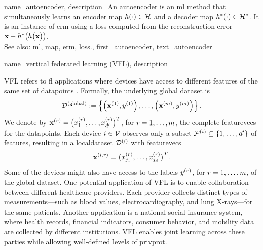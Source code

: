 {name={autoencoder},
	description={An autoencoder is an \gls{ml} method that simultaneously learns an encoder \gls{map} 
		$h(\cdot) \in \mathcal{H}$ and a decoder \gls{map} $h^{*}(\cdot) \in \mathcal{H}^{*}$. 
		It is an instance of \gls{erm} using a \gls{loss} computed from the reconstruction error 
		${\bf x} - h^{*}\big(  h \big( {\bf x} \big) \big)$.
					\\ 
		See also: \gls{ml}, \gls{map}, \gls{erm}, \gls{loss}.},
	first={autoencoder},
	text={autoencoder}
} 

{name={vertical federated learning (VFL)},
	description={
		VFL refers to \gls{fl} applications where  
		\glspl{device} have access to different \glspl{feature} of the same set of \glspl{datapoint} \cite{VFLChapter}. 
		Formally, the underlying global \gls{dataset} is
		\[
		\mathcal{D}^{(\mathrm{global})} := \left\{ \left({\bf x}^{(1)}, y^{(1)}\right), \ldots, \left({\bf x}^{(m)}, y^{(m)}\right) \right\}.
		\]
		We denote by ${\bf x}^{(r)} = \big( x^{(r)}_{1}, \ldots, x^{(r)}_{d'} \big)^{T}$, for $r=1,\ldots,m$, 
	     the complete \glspl{featurevec} for the \glspl{datapoint}. Each \gls{device} $i \in \mathcal{V}$ 
		observes only a subset $\mathcal{F}^{(i)} \subseteq \{1,\ldots,d'\}$ of \glspl{feature}, resulting 
		in a \gls{localdataset} $\mathcal{D}^{(i)}$ with \glspl{featurevec}
		\[
		{\bf x}^{(i,r)} = \big( x^{(r)}_{j_{1}}, \ldots, x^{(r)}_{j_{d}} \big)^{T}.
		\]
		Some of the \glspl{device} might also have access to the \glspl{label} $y^{(r)}$, for $r=1,\ldots,m$, 
		of the global \gls{dataset}. One potential application of VFL is to enable collaboration between 
		different healthcare providers. Each provider collects distinct types of measurements—such as blood 
		values, electrocardiography, and lung X-rays—for the same patients. Another application is a 
		national social insurance system, where health records, financial indicators, consumer behavior, 
		and mobility \gls{data} are collected by different institutions. VFL enables joint learning across 
		these parties while allowing well-defined levels of \gls{privprot}.
		\begin{figure}[H]
			\begin{center}

\end{center}
\end{figure}}}
